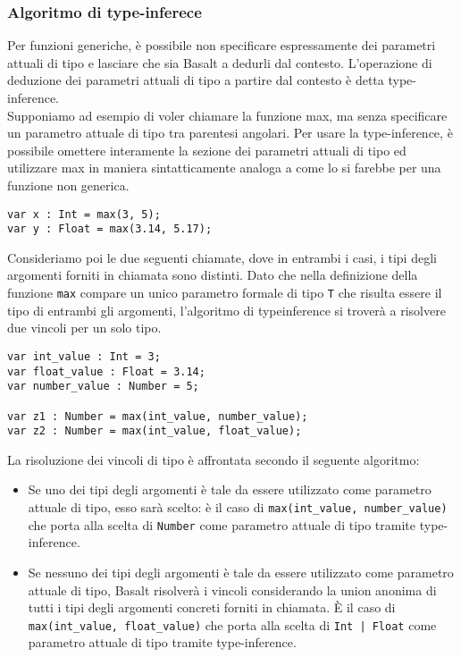 \subsubsection{Algoritmo di type-inferece}
Per funzioni generiche, è possibile non specificare espressamente dei parametri 
attuali di tipo e lasciare che sia Basalt a dedurli dal contesto. 
L’operazione di deduzione dei parametri attuali di tipo a partire dal 
contesto è detta type-inference. \\

Supponiamo ad esempio di voler chiamare la funzione max, ma 
senza specificare un parametro attuale di tipo tra parentesi angolari. 
Per usare la type-inference, 
è possibile omettere interamente la sezione dei parametri attuali di 
tipo ed utilizzare max in maniera sintatticamente analoga a come 
lo si farebbe per una funzione non generica. \\

\vspace{0.5cm}
\begin{lstlisting}[frame=single]
var x : Int = max(3, 5);
var y : Float = max(3.14, 5.17);
\end{lstlisting}
\vspace{0.5cm}

Consideriamo poi le due seguenti chiamate, dove in entrambi i casi, 
i tipi degli argomenti forniti in chiamata sono distinti. Dato che nella definizione della 
funzione \texttt{max} compare un unico parametro formale di tipo \texttt{T} che risulta essere 
il tipo di entrambi gli argomenti, l'algoritmo di typeinference si troverà a risolvere due vincoli
per un solo tipo.\\

\vspace{0.5cm}
\begin{lstlisting}[frame=single]
var int_value : Int = 3;
var float_value : Float = 3.14;
var number_value : Number = 5;

var z1 : Number = max(int_value, number_value);
var z2 : Number = max(int_value, float_value);
\end{lstlisting}
\vspace{0.5cm}
 
La risoluzione dei vincoli di tipo è affrontata secondo il seguente algoritmo:
\begin{itemize}
      \item Se uno dei tipi degli argomenti è tale da essere utilizzato come parametro attuale di tipo, 
      esso sarà scelto: è il caso di \texttt{max(int\_value, number\_value)} che porta alla scelta di 
      \texttt{Number} come parametro attuale di tipo tramite type-inference. 

      \item Se nessuno dei tipi degli argomenti è tale da essere utilizzato come parametro attuale di tipo,
      Basalt risolverà i vincoli considerando la union anonima di tutti i tipi degli argomenti concreti
      forniti in chiamata. È il caso di \texttt{max(int\_value, float\_value)} che porta alla scelta di
      \texttt{Int | Float} come parametro attuale di tipo tramite type-inference.
\end{itemize}
